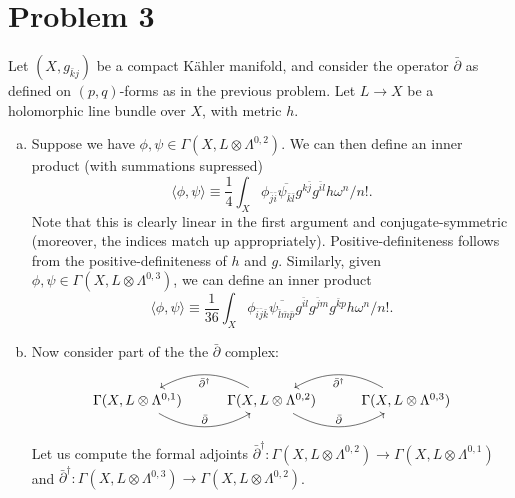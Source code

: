 \documentclass{../mathnotes}
\begin{document}
\section*{Problem 3}

Let $(X,g_{\bar kj})$ be a compact K\"ahler manifold, and consider the operator $\bar\partial$ as defined on $(p,q)$-forms as in
the previous problem. Let $L\to X$ be a holomorphic line bundle over $X$, with metric $h$.
\begin{enumerate}[(a)]
    \item Suppose we have $\phi,\psi\in\Gamma(X,L\otimes \Lambda^{0,2})$. We can then define an inner product (with summations supressed)
        \[\langle\phi,\psi\rangle\equiv \frac{1}{4}\int_X\phi_{\bar j\bar i}\overline{\psi_{\bar k\bar l}}g^{k\bar j}g^{\bar i l}h\omega^n/n!.\]
        Note that this is clearly linear in the first argument and conjugate-symmetric (moreover, the indices match up appropriately).
        Positive-definiteness follows from the positive-definiteness of $h$ and $g$. Similarly, given $\phi,\psi\in\Gamma(X,L\otimes \Lambda^{0,3})$,
        we can define an inner product
        \[\langle\phi,\psi\rangle\equiv \frac{1}{36}\int_X\phi_{\bar i\bar j\bar k}\overline{\psi_{\bar l\bar m\bar p}}g^{\bar il}g^{\bar jm}g^{\bar kp}h\omega^n/n!.\]
    \item Now consider part of the the $\bar\partial$ complex:
        \begin{equation*}
            \begin{tikzcd}
                \Gamma(X,L\otimes\Lambda^{0,1})\arrow[bend right]{r}{\bar\partial}&\Gamma(X,L\otimes\Lambda^{0,2})\arrow[bend right]{r}{\bar\partial}\arrow[bend right]{l}{\bar \partial^\dagger}&\Gamma(X,L\otimes\Lambda^{0,3})\arrow[bend right]{l}{\bar \partial^\dagger}%
            \end{tikzcd}
        \end{equation*}
        Let us compute the formal adjoints $\bar\partial^\dagger:\Gamma(X,L\otimes\Lambda^{0,2})\to\Gamma(X,L\otimes\Lambda^{0,1})$ and
        $\bar\partial^\dagger:\Gamma(X,L\otimes\Lambda^{0,3})\to\Gamma(X,L\otimes\Lambda^{0,2})$.


\end{enumerate}
\end{document}
